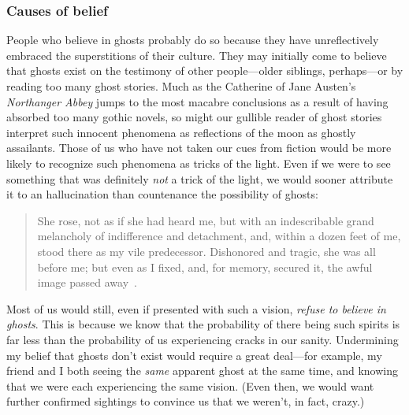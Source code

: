 \documentclass[11pt]{article}
\newenvironment{squote}{\begin{quote}\begin{singlespace}}{\end{singlespace}\end{quote}}
\begin{document}
\begin{spacing}{1.5}
\subsubsection{Causes of belief}
\label{unger-cause}
People who believe in ghosts probably do so because they have unreflectively embraced the superstitions of their culture. They may initially come to believe that ghosts exist on the testimony of other people---older siblings, perhaps---or by reading too many ghost stories. Much as the Catherine of Jane Austen's {\em Northanger Abbey} jumps to the most macabre conclusions as a result of having absorbed too many gothic novels, so might our gullible reader of ghost stories interpret such innocent phenomena as reflections of the moon as ghostly assailants. Those of us who have not taken our cues from fiction would be more likely to recognize such phenomena as tricks of the light. Even if we were to see something that was definitely {\em not} a trick of the light, we would sooner attribute it to an hallucination than countenance the possibility of ghosts:
%
\begin{squote}
She rose, not as if she had heard me, but with an indescribable grand melancholy of indifference and detachment, and, within a dozen feet of me, stood there as my vile predecessor. Dishonored and tragic, she was all before me; but even as I fixed, and, for memory, secured it, the awful image passed away~\citep[58]{james1991}.
\end{squote}
%
Most of us would still, even if presented with such a vision, {\em refuse to believe in ghosts}. This is because we know that the probability of there being such spirits is far less than the probability of us experiencing cracks in our sanity. Undermining my belief that ghosts don't exist would require a great deal---for example, my friend and I both seeing the {\em same} apparent ghost at the same time, and knowing that we were each experiencing the same vision. (Even then, we would want further confirmed sightings to convince us that we weren't, in fact, crazy.)


\end{spacing}
\end{document}
